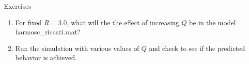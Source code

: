 \begin{frame}
Exercises
 \begin{enumerate}
 \item  For fixed $R=3.0$, what will the the effect of increasing $Q$ be in the model harmosc\_riccati.mat? 
 \item Run the simulation with various values of $Q$ and check to see if the predicted behavior is achieved.
\end{enumerate}
\end{frame}
